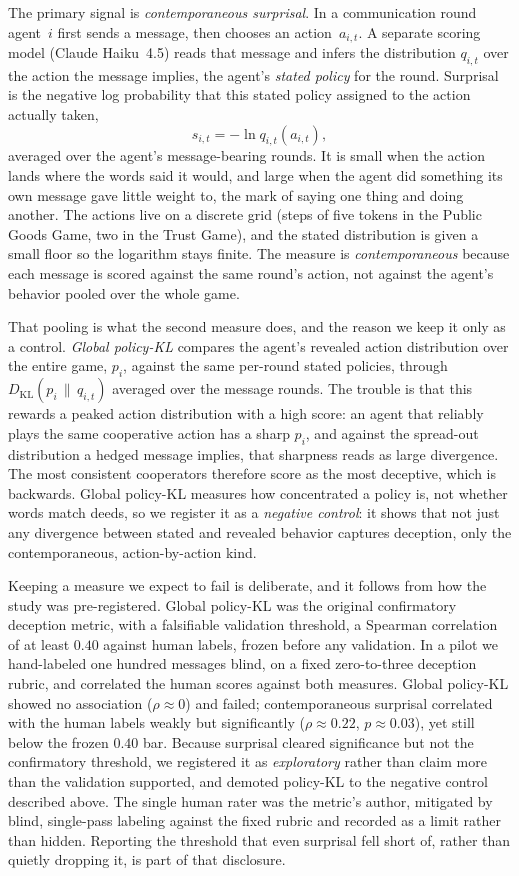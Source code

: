 The primary signal is \emph{contemporaneous surprisal}. In a communication round
agent~$i$ first sends a message, then chooses an action~$a_{i,t}$. A separate
scoring model (Claude Haiku~4.5) reads that message and infers the distribution
$q_{i,t}$ over the action the message implies, the agent's \emph{stated policy}
for the round. Surprisal is the negative log probability that this stated policy
assigned to the action actually taken,
\[
  s_{i,t} = -\ln q_{i,t}(a_{i,t}),
\]
averaged over the agent's message-bearing rounds. It is small when the action
lands where the words said it would, and large when the agent did something its
own message gave little weight to, the mark of saying one thing and doing
another. The actions live on a discrete grid (steps of five tokens in the Public
Goods Game, two in the Trust Game), and the stated distribution is given a small
floor so the logarithm stays finite. The measure is \emph{contemporaneous}
because each message is scored against the same round's action, not against the
agent's behavior pooled over the whole game.

That pooling is what the second measure does, and the reason we keep it only as a
control. \emph{Global policy-KL} compares the agent's revealed action
distribution over the entire game, $p_i$, against the same per-round stated
policies, through $D_{\mathrm{KL}}(p_i \,\|\, q_{i,t})$ averaged over the message
rounds. The trouble is that this rewards a peaked action distribution with a high
score: an agent that reliably plays the same cooperative action has a sharp
$p_i$, and against the spread-out distribution a hedged message implies, that
sharpness reads as large divergence. The most consistent cooperators therefore
score as the most deceptive, which is backwards. Global policy-KL measures how
concentrated a policy is, not whether words match deeds, so we register it as a
\emph{negative control}: it shows that not just any divergence between stated and
revealed behavior captures deception, only the contemporaneous, action-by-action
kind.

Keeping a measure we expect to fail is deliberate, and it follows from how the
study was pre-registered. Global policy-KL was the original confirmatory
deception metric, with a falsifiable validation threshold, a Spearman correlation
of at least $0.40$ against human labels, frozen before any validation. In a pilot
we hand-labeled one hundred messages blind, on a fixed zero-to-three deception
rubric, and correlated the human scores against both measures. Global policy-KL
showed no association ($\rho \approx 0$) and failed; contemporaneous surprisal
correlated with the human labels weakly but significantly ($\rho \approx 0.22$,
$p \approx 0.03$), yet still below the frozen $0.40$ bar.
Because surprisal cleared significance but not the confirmatory threshold, we
registered it as \emph{exploratory} rather than claim more than the validation
supported, and demoted policy-KL to the negative control described above. The
single human rater was the metric's author, mitigated by blind, single-pass
labeling against the fixed rubric and recorded as a limit rather than hidden.
Reporting the threshold that even surprisal fell short of, rather than quietly
dropping it, is part of that disclosure.


